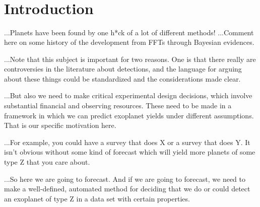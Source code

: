 \documentclass[modern]{aastex63}
\newcommand{\acronym}[1]{{\small{#1}}}
\begin{document}

\section*{~}\clearpage
\section{Introduction} \label{sec:intro}

...Planets have been found by one h*ck of a lot of different methods!
...Comment here on some history of the development from \acronym{FFT}s
through Bayesian evidences.

...Note that this subject is important for two reasons. One is that
there really are controversies in the literature about detections, and
the language for arguing about these things could be standardized and
the considerations made clear.

...But also we need to make critical experimental design decisions,
which involve substantial financial and observing resources. These
need to be made in a framework in which we can predict exoplanet
yields under different assumptions. That is our specific motivation here.

...For example, you could have a survey that does X or a survey that does Y.
It isn't obvious without some kind of forecast which will yield more planets
of some type Z that you care about.

...So here we are going to forecast. And if
we are going to forecast, we need to make a well-defined, automated method
for deciding that we do or could detect an exoplanet of type Z in a data
set with certain properties.
\end{document}
